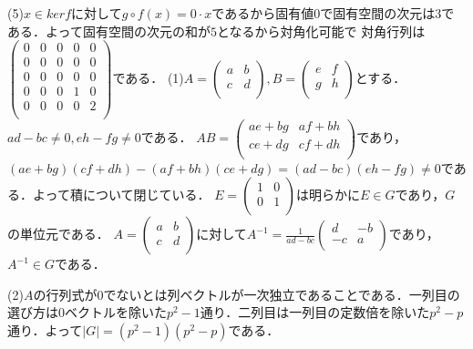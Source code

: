 \documentclass[
		book,
		head_space=20mm,
		foot_space=20mm,
		gutter=10mm,
		line_length=190mm
]{jlreq}
\begin{document}
    (5)$x \in ker f$に対して$g\circ f(x)=0 \cdot x$であるから固有値$0$で固有空間の次元は$3$である．よって固有空間の次元の和が$5$となるから対角化可能で
    対角行列は$\begin{pmatrix}
        0 & 0 & 0 & 0 & 0 \\
        0 & 0 & 0 & 0 & 0 \\
        0 & 0 & 0 & 0 & 0 \\
        0 & 0 & 0 & 1 & 0 \\
        0 & 0 & 0 & 0 & 2 \\
    \end{pmatrix}$である．
    (1)$A=\begin{pmatrix}
        a & b \\
        c & d \\
    \end{pmatrix},B=\begin{pmatrix}
        e & f \\
        g & h \\
        \end{pmatrix}$とする．$ad-bc\neq 0,eh-fg\neq 0$である．
        $AB=\begin{pmatrix}
            ae+bg & af+bh \\
            ce+dg & cf+dh \\
            \end{pmatrix}$であり，$(ae+bg)(cf+dh)-(af+bh)(ce+dg)=(ad-bc)(eh-fg)\neq 0$である．よって積について閉じている．
    $E=\begin{pmatrix}
        1 & 0 \\
        0 & 1 \\
        \end{pmatrix}$は明らかに$E \in G$であり，$G$の単位元である．
    $A=\begin{pmatrix}
        a & b \\
        c & d \\
    \end{pmatrix}$に対して$A^{-1}=\frac{1}{ad-bc}\begin{pmatrix}
        d & -b \\
        -c & a \\
        \end{pmatrix}$であり，$A^{-1} \in G$である．

    (2)$A$の行列式が$0$でないとは列ベクトルが一次独立であることである．一列目の選び方は$0$ベクトルを除いた$p^2-1$通り．二列目は一列目の定数倍を除いた$p^2-p$通り．よって$|G|=(p^2-1)(p^2-p)$である．
\end{document}
